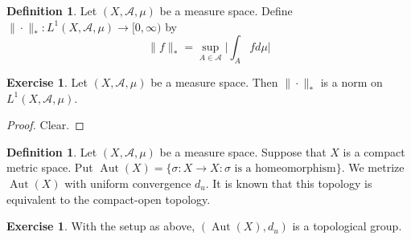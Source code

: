 \documentclass[12pt]{amsart}
\theoremstyle{definition}
\newtheorem{defn}[definition]{Definition}
\newtheorem{ex}[definition]{Exercise}
\newcommand{\sig}{\sigma}
\newcommand{\MA}{\mathcal{A}}
\newcommand{\Rg}{[0,\infty)}
\DeclareMathOperator{\Aut}{Aut}
\begin{document}
	\begin{defn}
	Let $(X, \MA, \mu)$ be a measure space. Define $\| \cdot \|_*: L^1(X, \MA, \mu) \rightarrow \Rg$ by  
	 $$\| f \|_* = \sup_{A \in \MA} \bigg | \int_A f d\mu \bigg |$$ 
	\end{defn}
	
	\begin{ex}
	Let $(X, \MA, \mu)$ be a measure space. Then $\| \cdot \|_*$ is a norm on $L^1(X, \MA, \mu)$.
	\end{ex}
	
	\begin{proof}
	Clear.
	\end{proof}
	
	\begin{defn}
	Let $(X, \MA, \mu)$ be a measure space. Suppose that $X$ is a compact metric space. Put $\Aut(X) = \{\sig:X\rightarrow X: \sig \text{ is a homeomorphism} \}$. We metrize $\Aut(X)$ with uniform convergence $d_u$. It is known that this topology is equivalent to the compact-open topology.
	\end{defn}
	
	\begin{ex}
	With the setup as above, $(\Aut(X), d_{u} )$ is a topological group.
	\end{ex}
	
\end{document}

